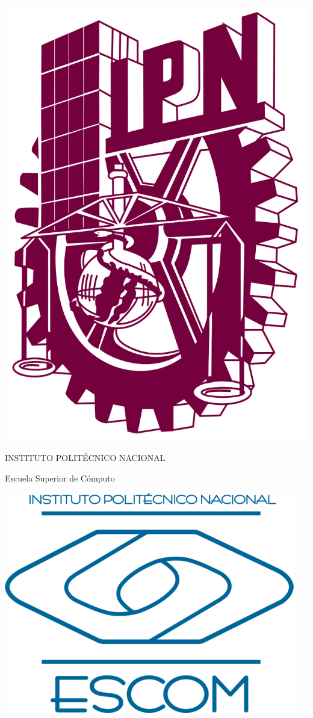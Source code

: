 \begin{titlepage}
    \centering
    
    \begin{minipage}{0.2 \textwidth}
        \centering
        \includegraphics[width=0.7 \textwidth]{src/images/logo_ipn.png}
    \end{minipage}
    \hfill
    \begin{minipage}{0.5\textwidth}
        \centering
        {INSTITUTO POLITÉCNICO NACIONAL \par}
        \vspace{0.3cm}
        {Escuela Superior de Cómputo\par}
    \end{minipage}
    \hfill
    \begin{minipage}{0.2 \textwidth}
        \centering
        \includegraphics[width=1 \textwidth]{src/images/escudoESCOM.png}
    \end{minipage}
    

\end{titlepage}
